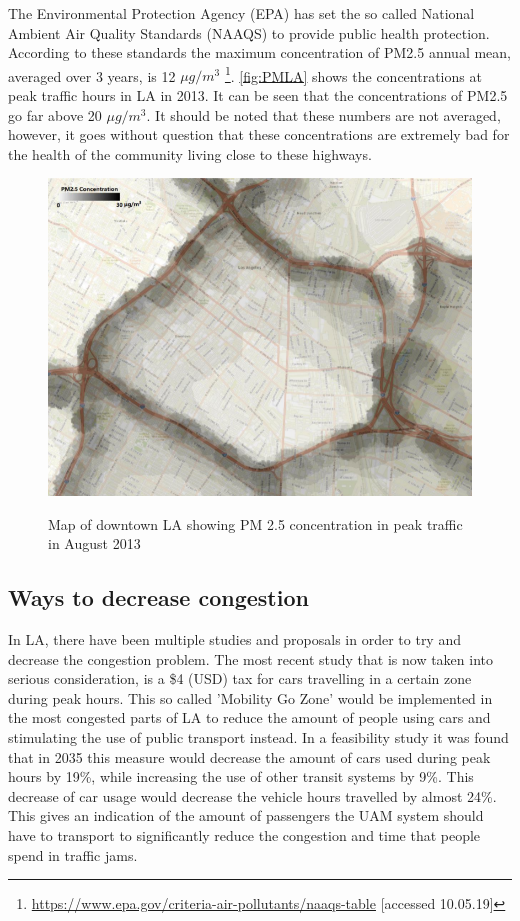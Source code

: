 The Environmental Protection Agency (EPA) has set the so called National Ambient Air Quality Standards (NAAQS) to provide public health protection. According to these standards the maximum concentration of PM2.5 annual mean, averaged over 3 years,
is 12 $\mu g / m^3$ \footnote{\url{https://www.epa.gov/criteria-air-pollutants/naaqs-table} [accessed 10.05.19]}. \autoref{fig:PMLA} shows the concentrations at peak traffic hours in LA in 2013. It can be seen that the concentrations of PM2.5 go far above 20 $\mu g / m^3$. It should be noted that these numbers are not averaged, however, it goes without question that these concentrations are extremely bad for the health of the community living close to these highways.  

\begin{figure}[h]
    \centering
    \includegraphics[width=0.75\linewidth]{Figures/PMLA.png}
    \captionsetup{justification=centering}
    \caption{Map of downtown LA showing PM 2.5 concentration in peak traffic in August 2013} \cite{pmlevelLA}
    \label{fig:PMLA}
\end{figure}

\subsection{Ways to decrease congestion}
\label{decrease}
In LA, there have been multiple studies and proposals in order to try and decrease the congestion problem. The most recent study that is now taken into serious consideration, is a \$4 (USD) tax for cars travelling in a certain zone during peak hours. This so called 'Mobility Go Zone' \cite{mobilitygo} would be implemented in the most congested parts of LA to reduce the amount of people using cars and stimulating the use of public transport instead. In a feasibility study it was found that in 2035 this measure would decrease the amount of cars used during peak hours by 19\%, while increasing the use of other transit systems by 9\%. This decrease of car usage would decrease the vehicle hours travelled by almost 24\%. This gives an indication of the amount of passengers the UAM system should have to transport to significantly reduce the congestion and time that people spend in traffic jams. 

